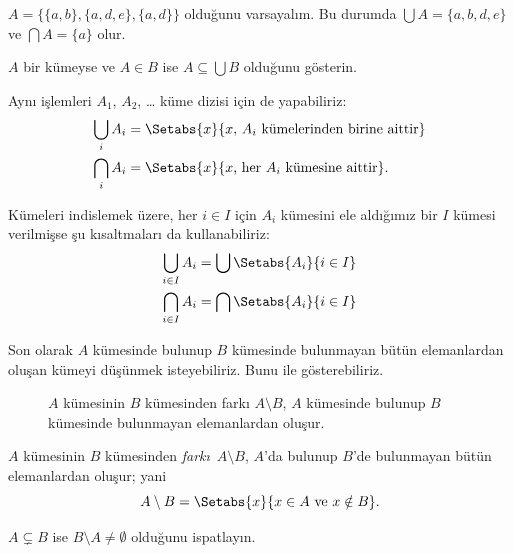 \documentclass[../../../include/open-logic-section]{subfiles}
\begin{document}
\begin{ex}
$A = \{ \{ a, b \}, \{ a, d, e \}, \{ a, d \} \}$ olduğunu varsayalım.
Bu durumda $\bigcup A = \{ a, b, d, e \}$ ve $\bigcap A = \{ a \}$ olur.
\end{ex}
\begin{prob}
	$A$ bir kümeyse ve $A \in B$ ise $A \subseteq \bigcup B$ olduğunu gösterin.
\end{prob}

Aynı işlemleri $A_1$, $A_2$, \dots{} küme dizisi için de yapabiliriz:
\begin{align*}
\bigcup_i A_i & = \Setabs{x}{x \text{, } A_i\text{ kümelerinden birine aittir}}\\
\bigcap_i A_i & = \Setabs{x}{x \text{, her } A_i\text{ kümesine aittir}}.
\end{align*}

Kümeleri indislemek üzere, her $i \in I$ için $A_i$ kümesini ele aldığımız bir
$I$ kümesi verilmişse şu kısaltmaları da kullanabiliriz:
\begin{align*}
	\bigcup_{i \in I} A_i & = \bigcup \Setabs{A_i }{i \in I}\\
	\bigcap_{i \in I} A_i & = \bigcap\Setabs{A_i}{i \in I}
\end{align*}

Son olarak $A$ kümesinde bulunup $B$ kümesinde bulunmayan bütün elemanlardan
oluşan kümeyi düşünmek isteyebiliriz. Bunu  ile
gösterebiliriz.

\begin{figure}
  \caption{$A$ kümesinin $B$ kümesinden farkı $A \setminus B$, $A$
    kümesinde bulunup $B$ kümesinde bulunmayan elemanlardan oluşur.}
\end{figure}

\begin{defn}
$A$ kümesinin $B$ kümesinden \emph{farkı}~$A \setminus B$, $A$'da bulunup
$B$'de bulunmayan bütün elemanlardan oluşur; yani
\[
A\setminus B = \Setabs{x}{x\in A \text{ ve } x \notin B}.
\]
\end{defn}

\begin{prob}
	$A \subsetneq B$ ise $B \setminus A \neq \emptyset$ olduğunu ispatlayın.
\end{prob}
\end{document}
